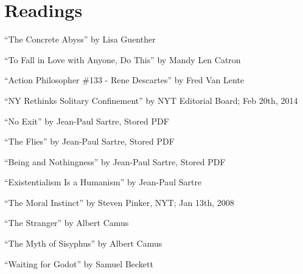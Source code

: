 \documentclass[11 pt, twoside]{article}
\begin{document}
\section{Readings}
\begin{enumerate}
\hypertarget{1}{\item ``The Concrete Abyss'' by Lisa Guenther}
\hypertarget{2}{\item ``To Fall in Love with Anyone, Do This'' by Mandy Len Catron}
\hypertarget{3}{\item ``Action Philosopher \#133 - Rene Descartes'' by Fred Van Lente}
\hypertarget{4}{\item ``NY Rethinks Solitary Confinement'' by NYT Editorial Board; Feb 20th, 2014}
\hypertarget{5}{\item ``No Exit'' by Jean-Paul Sartre, Stored PDF}
\hypertarget{6}{\item ``The Flies'' by Jean-Paul Sartre, Stored PDF}
\hypertarget{7}{\item ``Being and Nothingness'' by Jean-Paul Sartre, Stored PDF}
\hypertarget{8}{\item ``Existentialism Is a Humanism'' by Jean-Paul Sartre}
\hypertarget{9}{\item ``The Moral Instinct'' by Steven Pinker, NYT; Jan 13th, 2008}
\hypertarget{10}{\item ``The Stranger'' by Albert Camus}
\hypertarget{11}{\item ``The Myth of Sisyphus'' by Albert Camus}
\hypertarget{12}{\item ``Waiting for Godot'' by Samuel Beckett}
\end{enumerate}
\end{document}
